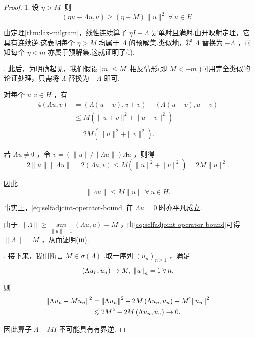 \begin{proof}
1. 设 $\eta  > M$ .则
\[
\left( {{\eta u} - {\Lambda u},u}\right)  \geq  \left( {\eta  - M}\right) \| u{\| }^{2}\;\forall\,u \in  H.
\]

由定理\ref{thm:lax-milgram}，线性连续算子 ${\eta I} - \Lambda$ 是单射且满射.由开映射定理，它具有连续逆.这表明每个 $\eta  > M$ 均属于 $\Lambda$ 的预解集.类似地，将 $\Lambda$ 替换为 $- \Lambda$ ，可知每个 $\eta  < m$ 亦属于预解集.这就证明了(i).

. 此后，为明确起见，我们假设 $\left| m\right|  \leq  M$ .相反情形(即 $M <  - m$ )可用完全类似的论证处理，只需将 $\Lambda$ 替换为 $- \Lambda$ 即可.

对每个 $u,v \in  H$ ，有
{\setjot[-2]\begin{align*}
    4\left( {{\Lambda u},v}\right)  &= \left( {\Lambda \left( {u + v}\right) ,u + v}\right)  - \left( {\Lambda \left( {u - v}\right) ,u - v}\right)\\
    &\leq  M\left( {\| u + v{\| }^{2} + \| u - v{\| }^{2}}\right)\\
    &= {2M}\left( {\| u{\| }^{2} + \| v{\| }^{2}}\right) .
\end{align*}}

若 ${\Lambda u} \neq  0$ ，令 $v \doteq  \left( {\| u\| /\| {\Lambda u}\| }\right) {\Lambda u}$ ，则得
\[
2\| u\| \| {\Lambda u}\|  = 2\left( {{\Lambda u},v}\right)  \leq  M\left( {\| u{\| }^{2} + \| v{\| }^{2}}\right)  = {2M}\| u{\| }^{2}.
\]

因此
\begin{equation}\tag{6.7}\label{eq:selfadjoint-operator-bound}
\| {\Lambda u}\|  \leq  M\| u\| \;\forall\,u \in  H.
\end{equation}

事实上，\eqref{eq:selfadjoint-operator-bound} 在 ${\Lambda u} = 0$ 时亦平凡成立.

由于 $\| \Lambda \|  \geq  \mathop{\sup }\limits_{{\| u\|  = 1}}\left( {{\Lambda u},u}\right)  = M$ ，由\eqref{eq:selfadjoint-operator-bound}可得 $\| \Lambda \|  = M$ ，从而证明(iii).

. 接下来，我们断言 $M \in  \sigma \left( \Lambda \right)$ .取一序列 ${\left( {u}_{n}\right) }_{n \geq  1}$ ，满足
\[
\left( {\Lambda {u}_{n},{u}_{n}}\right)  \rightarrow  M,\;\norm{u}_{n} = 1\;\forall\,n.
\]

则
{\setjot[-2]\begin{align*}
    \norm{\Lambda {u}_{n} - Mu_n}^{2} &= {\norm{\Lambda u_n}}^{2} - {2M}\left( {\Lambda {u}_{n},{u}_{n}}\right)  + {M}^{2}{\norm{u_n}}^{2} \\
    &\leqslant  2{M}^{2} - {2M}\left( {\Lambda {u}_{n},{u}_{n}}\right)  \rightarrow  0.
\end{align*}}

因此算子 $\Lambda  - {MI}$ 不可能具有有界逆.
\end{proof}

